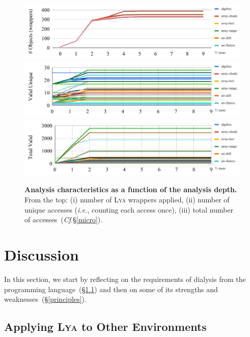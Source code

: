 \documentclass[letterpaper,twocolumn,10pt]{article}
\def\ie{{\em i.e.}, }
\newcommand{\cf}[1]{(\emph{Cf}.\S\ref{#1})}
\newcommand{\sx}[1]{(\S\ref{#1})}
\newcommand{\sys}{{\scshape Lya}\xspace}
\begin{document}
\begin{figure}[t]
  \centering
  \includegraphics[width=\columnwidth]{./figs/lya_n_obj}
  \includegraphics[width=\columnwidth]{./figs/lya_unique_valid}
  \includegraphics[width=\columnwidth]{./figs/lya_total_valid}
  \caption{
    \textbf{Analysis characteristics as a function of the analysis depth.}
    From the top:
    (i) number of \sys wrappers applied,
    (ii) number of unique accesses (\ie counting each access once),
    (iii) total number of accesses~\cf{micro}.
  }
  \label{fig:objects}
\end{figure}

\section{Discussion}
\label{diss}

In this section, we start by reflecting on the requirements of dialysis from the programming language~\sx{reqs} and then on some of its strengths and weaknesses~\sx{principles}.

\subsection{Applying \sys to Other Environments}
\label{reqs}
\end{document}
